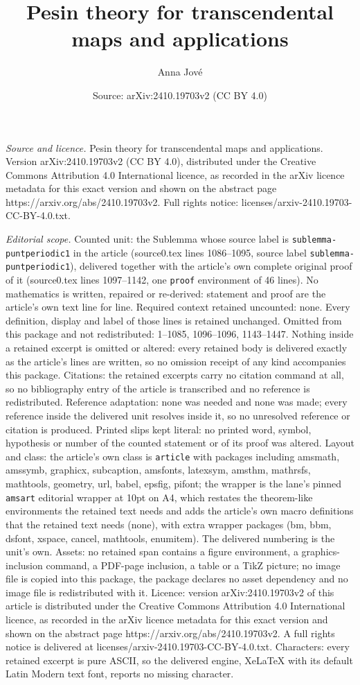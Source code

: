 \documentclass[10pt,a4paper]{amsart}
\title[Pesin theory for transcendental maps and applications]{Pesin theory for transcendental maps and applications}
\author{Anna Jov\'e}
\date{Source: arXiv:2410.19703v2 (CC BY 4.0)}
\begin{document}
\maketitle

\noindent\emph{Source and licence.} Pesin theory for transcendental maps and applications. Version arXiv:2410.19703v2 (CC BY 4.0), distributed under the Creative Commons Attribution 4.0 International licence, as recorded in the arXiv licence metadata for this exact version and shown on the abstract page https://arxiv.org/abs/2410.19703v2. Full rights notice: licenses/arxiv-2410.19703-CC-BY-4.0.txt.\par\smallskip

\noindent\textit{Editorial scope.} Counted unit: the Sublemma whose source label is \texttt{sublemma-puntperiodic1} in the article (source0.tex lines 1086--1095, source label \texttt{sublemma-puntperiodic1}), delivered together with the article's own complete original proof of it (source0.tex lines 1097--1142, one \texttt{proof} environment of 46 lines). No mathematics is written, repaired or re-derived: statement and proof are the article's own text line for line. Required context retained uncounted: none. Every definition, display and label of those lines is retained unchanged. Omitted from this package and not redistributed: 1--1085, 1096--1096, 1143--1447. Nothing inside a retained excerpt is omitted or altered: every retained body is delivered exactly as the article's lines are written, so no omission receipt of any kind accompanies this package. Citations: the retained excerpts carry no citation command at all, so no bibliography entry of the article is transcribed and no reference is redistributed. Reference adaptation: none was needed and none was made; every reference inside the delivered unit resolves inside it, so no unresolved reference or citation is produced. Printed slips kept literal: no printed word, symbol, hypothesis or number of the counted statement or of its proof was altered. Layout and class: the article's own class is \texttt{article} with packages including amsmath, amssymb, graphicx, subcaption, amsfonts, latexsym, amsthm, mathrsfs, mathtools, geometry, url, babel, epsfig, pifont; the wrapper is the lane's pinned \texttt{amsart} editorial wrapper at 10pt on A4, which restates the theorem-like environments the retained text needs and adds the article's own macro definitions that the retained text needs (none), with extra wrapper packages (bm, bbm, dsfont, xspace, cancel, mathtools, enumitem). The delivered numbering is the unit's own. Assets: no retained span contains a figure environment, a graphics-inclusion command, a PDF-page inclusion, a table or a TikZ picture; no image file is copied into this package, the package declares no asset dependency and no image file is redistributed with it. Licence: version arXiv:2410.19703v2 of this article is distributed under the Creative Commons Attribution 4.0 International licence, as recorded in the arXiv licence metadata for this exact version and shown on the abstract page https://arxiv.org/abs/2410.19703v2. A full rights notice is delivered at licenses/arxiv-2410.19703-CC-BY-4.0.txt. Characters: every retained excerpt is pure ASCII, so the delivered engine, XeLaTeX with its default Latin Modern text font, reports no missing character.
\end{document}
